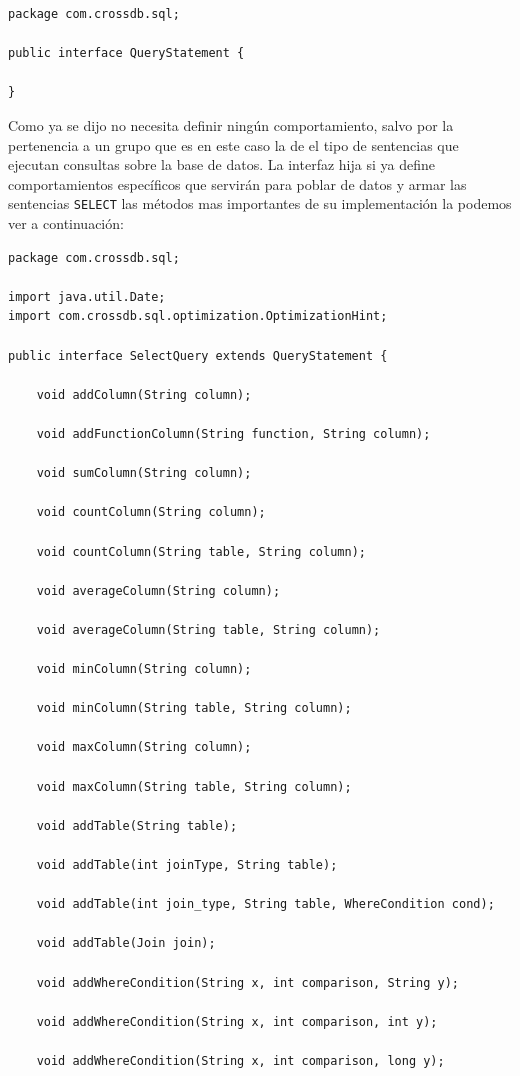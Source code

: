 \begin{lstlisting}[title=código interfaz QueryStatement]
package com.crossdb.sql;

public interface QueryStatement {

}
\end{lstlisting}

Como ya se dijo no necesita definir ningún comportamiento, salvo por la pertenencia a un grupo que es en este caso la de el tipo de sentencias que ejecutan consultas sobre la base de datos. La interfaz hija si ya define comportamientos específicos que servirán para poblar de datos y armar las sentencias \verb=SELECT= las métodos mas importantes de su implementación la podemos ver a continuación:

\begin{lstlisting}[title=código interfaz UpdateStatement]
package com.crossdb.sql;

import java.util.Date;
import com.crossdb.sql.optimization.OptimizationHint;

public interface SelectQuery extends QueryStatement {

	void addColumn(String column);

	void addFunctionColumn(String function, String column);

	void sumColumn(String column);

	void countColumn(String column);

	void countColumn(String table, String column);

	void averageColumn(String column);

	void averageColumn(String table, String column);

	void minColumn(String column);

	void minColumn(String table, String column);

	void maxColumn(String column);

	void maxColumn(String table, String column);

	void addTable(String table);

	void addTable(int joinType, String table);

	void addTable(int join_type, String table, WhereCondition cond);

	void addTable(Join join);

	void addWhereCondition(String x, int comparison, String y);

	void addWhereCondition(String x, int comparison, int y);

	void addWhereCondition(String x, int comparison, long y);


\end{lstlisting}
